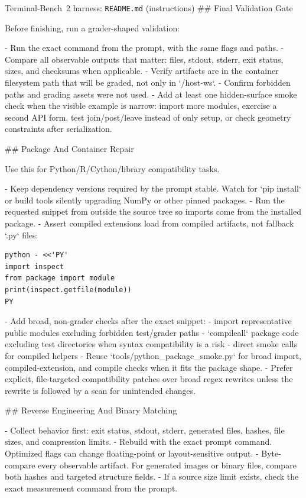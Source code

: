 \documentclass{llmxive}
\begin{document}
\begin{promptbox}{Terminal-Bench~2 harness: \texttt{README.md} (instructions)}
## Final Validation Gate

Before finishing, run a grader-shaped validation:

- Run the exact command from the prompt, with the same flags and paths.
- Compare all observable outputs that matter: files, stdout, stderr, exit status, sizes, and checksums when applicable.
- Verify artifacts are in the container filesystem path that will be graded, not only in `/host-ws`.
- Confirm forbidden paths and grading assets were not used.
- Add at least one hidden-surface smoke check when the visible example is narrow: import more modules, exercise a second API form, test join/post/leave instead of only setup, or check geometry constraints after serialization.

## Package And Container Repair

Use this for Python/R/Cython/library compatibility tasks.

- Keep dependency versions required by the prompt stable. Watch for `pip install` or build tools silently upgrading NumPy or other pinned packages.
- Run the requested snippet from outside the source tree so imports come from the installed package.
- Assert compiled extensions load from compiled artifacts, not fallback `.py` files:

\begin{lstlisting}
python - <<'PY'
import inspect
from package import module
print(inspect.getfile(module))
PY
\end{lstlisting}
- Add broad, non-grader checks after the exact snippet:
  - import representative public modules excluding forbidden test/grader paths
  - `compileall` package code excluding test directories when syntax compatibility is a risk
  - direct smoke calls for compiled helpers
- Reuse `tools/python_package_smoke.py` for broad import, compiled-extension, and compile checks when it fits the package shape.
- Prefer explicit, file-targeted compatibility patches over broad regex rewrites unless the rewrite is followed by a scan for unintended changes.

## Reverse Engineering And Binary Matching

- Collect behavior first: exit status, stdout, stderr, generated files, hashes, file sizes, and compression limits.
- Rebuild with the exact prompt command. Optimized flags can change floating-point or layout-sensitive output.
- Byte-compare every observable artifact. For generated images or binary files, compare both hashes and targeted structure fields.
- If a source size limit exists, check the exact measurement command from the prompt.


\end{promptbox}
\end{document}
